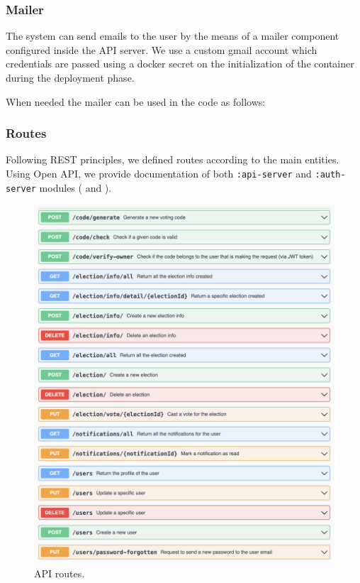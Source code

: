 \documentclass{scrartcl}
\begin{document}
\subsubsection{Mailer}
The system can send emails to the user by the means of a mailer component configured inside the API server. 
We use a custom gmail account which credentials are passed using a docker secret on the initialization of the container during the deployment phase.

When needed the mailer can be used in the code as follows:



\subsubsection{Routes}

Following REST principles, we defined routes according to the main entities.
Using Open API, we provide documentation of both \texttt{:api-server} and \texttt{:auth-server} modules ( and ).

\begin{figure}
    \centering
    \includegraphics[width=\textwidth]{./figures/backend-routes/api.png}
    \caption{API routes.}
    \label{fig:backend-routes-api}
\end{figure}
\end{document}

